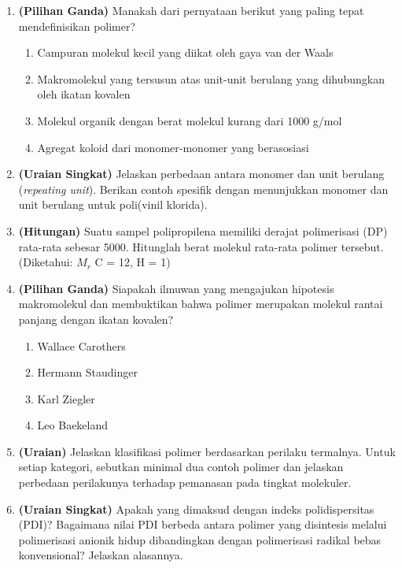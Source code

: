 \documentclass[12pt,a4paper,openany]{book}
\begin{document}
\begin{enumerate}[label=\textbf{\arabic*.}]

\item \textbf{(Pilihan Ganda)} Manakah dari pernyataan berikut yang paling tepat mendefinisikan polimer?
\begin{enumerate}[label=(\alph*)]
  \item Campuran molekul kecil yang diikat oleh gaya van der Waals
  \item Makromolekul yang tersusun atas unit-unit berulang yang dihubungkan oleh ikatan kovalen
  \item Molekul organik dengan berat molekul kurang dari 1000 g/mol
  \item Agregat koloid dari monomer-monomer yang berasosiasi
\end{enumerate}

\item \textbf{(Uraian Singkat)} Jelaskan perbedaan antara monomer dan unit berulang (\textit{repeating unit}). Berikan contoh spesifik dengan menunjukkan monomer dan unit berulang untuk poli(vinil klorida).

\item \textbf{(Hitungan)} Suatu sampel polipropilena memiliki derajat polimerisasi (DP) rata-rata sebesar 5000. Hitunglah berat molekul rata-rata polimer tersebut. (Diketahui: $M_r$ C = 12, H = 1)

\item \textbf{(Pilihan Ganda)} Siapakah ilmuwan yang mengajukan hipotesis makromolekul dan membuktikan bahwa polimer merupakan molekul rantai panjang dengan ikatan kovalen?
\begin{enumerate}[label=(\alph*)]
  \item Wallace Carothers
  \item Hermann Staudinger
  \item Karl Ziegler
  \item Leo Baekeland
\end{enumerate}

\item \textbf{(Uraian)} Jelaskan klasifikasi polimer berdasarkan perilaku termalnya. Untuk setiap kategori, sebutkan minimal dua contoh polimer dan jelaskan perbedaan perilakunya terhadap pemanasan pada tingkat molekuler.

\item \textbf{(Uraian Singkat)} Apakah yang dimaksud dengan indeks polidispersitas (PDI)? Bagaimana nilai PDI berbeda antara polimer yang disintesis melalui polimerisasi anionik hidup dibandingkan dengan polimerisasi radikal bebas konvensional? Jelaskan alasannya.


\end{enumerate}
\end{document}
